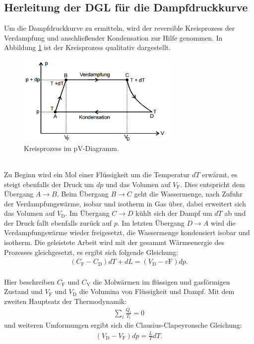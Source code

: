  \subsection{Herleitung der DGL für die Dampfdruckkurve}
Um die Dampfdruckkurve zu ermitteln, wird der reversible Kreisprozess der
Verdampfung und anschließender Kondensation zur Hilfe genommen.
In Abbildung \ref{fig:kreisprozess} ist der Kreisprozess qualitativ dargestellt.
\begin{figure}
 \centering
 \includegraphics[width=0.7\textwidth]{kreisprozess.png}
 \caption{Kreisprozess im pV-Diagramm. }
 \label{fig:kreisprozess}
 \end{figure}\\
Zu Beginn wird ein Mol einer Flüssigkeit um die Temperatur $dT$ erwärmt, es steigt ebenfalls
der Druck um $dp$ und das Volumen auf $V_\mathrm{F}$. Dies entspricht dem Übergang $A\longrightarrow B$.
Beim Übergang $B\longrightarrow C$ geht die Wassermenge, nach Zufuhr der Verdampfungswärme, isobar
und isotherm in Gas über, dabei erweitert sich das Volumen auf $V_\mathrm{D}$.
Im Übergang $C \longrightarrow D$ kühlt sich der Dampf um $dT$ ab und der Druck
fallt ebenfalls zurück auf $p$. Im letzten Übergang $D\longrightarrow A$ wird die
Verdampfungswärme wieder freigesetzt, die Wassermenge kondensiert isobar und isotherm.
Die geleistete Arbeit wird mit der gesammt Wärmeenergie des Prozesses gleichgesetzt,
es ergibt sich folgende Gleichung:
\begin{align}
(C_\mathrm{F}-C_\mathrm{D})dT+dL=(V_\mathrm{D}-v\mathrm{F})dp.
\end{align}\\
Hier beschreiben $C_\mathrm{F}$ und $C_\mathrm{V}$ die Molwärmen im flüssigen und
gasförmigen Zustand und $V_\mathrm{F}$ und $V_\mathrm{D}$ die Volumina von Flüssigkeit und Dampf.
Mit dem zweiten Hauptsatz der Thermodynamik:
\begin{align}
\sum_{i}\frac{Q_i}{T_i}=0
\end{align}
und weiteren Umformungen ergibt sich die Clausius-Clapeyronsche Gleichung:
\begin{align}
(V_\mathrm{D}-V_\mathrm{F})dp=\frac{L}{T}dT\label{eqn:clausius}.
\end{align}
